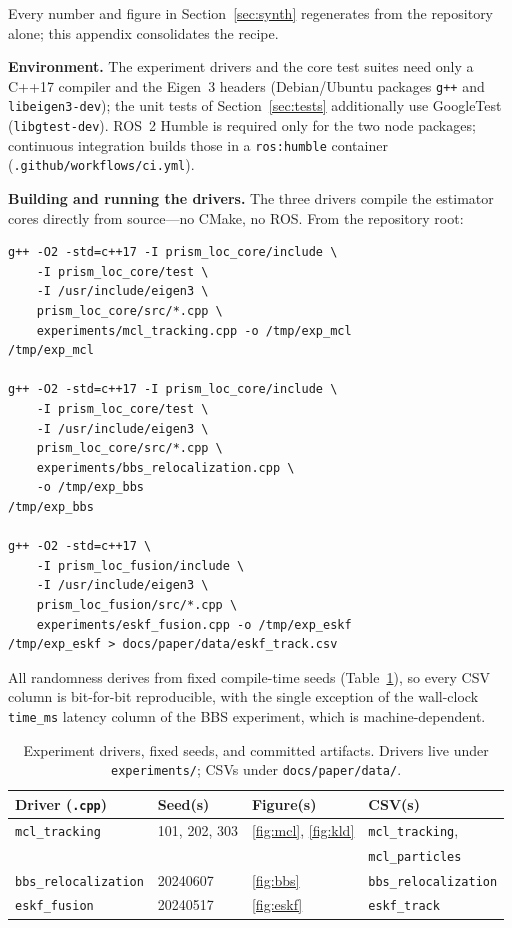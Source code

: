 \appendix[Reproducibility]\label{sec:repro}

Every number and figure in Section~\ref{sec:synth} regenerates from the
repository alone; this appendix consolidates the recipe.

\textbf{Environment.}
The experiment drivers and the core test suites need only a C++17
compiler and the Eigen~3 headers (Debian/Ubuntu packages \texttt{g++}
and \texttt{libeigen3-dev}); the unit tests of Section~\ref{sec:tests}
additionally use GoogleTest (\texttt{libgtest-dev}). ROS~2 Humble is
required only for the two node packages; continuous integration builds
those in a \texttt{ros:humble} container
(\texttt{.github/workflows/ci.yml}).

\textbf{Building and running the drivers.}
The three drivers compile the estimator cores directly from source---no
CMake, no ROS. From the repository root:

{\footnotesize
\begin{verbatim}
g++ -O2 -std=c++17 -I prism_loc_core/include \
    -I prism_loc_core/test \
    -I /usr/include/eigen3 \
    prism_loc_core/src/*.cpp \
    experiments/mcl_tracking.cpp -o /tmp/exp_mcl
/tmp/exp_mcl

g++ -O2 -std=c++17 -I prism_loc_core/include \
    -I prism_loc_core/test \
    -I /usr/include/eigen3 \
    prism_loc_core/src/*.cpp \
    experiments/bbs_relocalization.cpp \
    -o /tmp/exp_bbs
/tmp/exp_bbs

g++ -O2 -std=c++17 \
    -I prism_loc_fusion/include \
    -I /usr/include/eigen3 \
    prism_loc_fusion/src/*.cpp \
    experiments/eskf_fusion.cpp -o /tmp/exp_eskf
/tmp/exp_eskf > docs/paper/data/eskf_track.csv
\end{verbatim}
}

\noindent
All randomness derives from fixed compile-time seeds
(Table~\ref{tab:repro}), so every CSV column is bit-for-bit
reproducible, with the single exception of the wall-clock
\texttt{time\_ms} latency column of the BBS experiment, which is
machine-dependent.

\begin{table}[t]
\centering
\caption{Experiment drivers, fixed seeds, and committed artifacts.
Drivers live under \texttt{experiments/}; CSVs under
\texttt{docs/paper/data/}.}
\label{tab:repro}
\footnotesize
\setlength{\tabcolsep}{2.5pt}
\begin{tabular}{@{}llll@{}}
\toprule
Driver (\texttt{.cpp}) & Seed(s) & Figure(s) & CSV(s) \\
\midrule
\texttt{mcl\_tracking} & 101, 202, 303 & \ref{fig:mcl}, \ref{fig:kld}
  & \texttt{mcl\_tracking}, \\
 & & & \texttt{mcl\_particles} \\
\texttt{bbs\_relocalization} & 20240607 & \ref{fig:bbs}
  & \texttt{bbs\_relocalization} \\
\texttt{eskf\_fusion} & 20240517 & \ref{fig:eskf}
  & \texttt{eskf\_track} \\
\bottomrule
\end{tabular}
\end{table}

